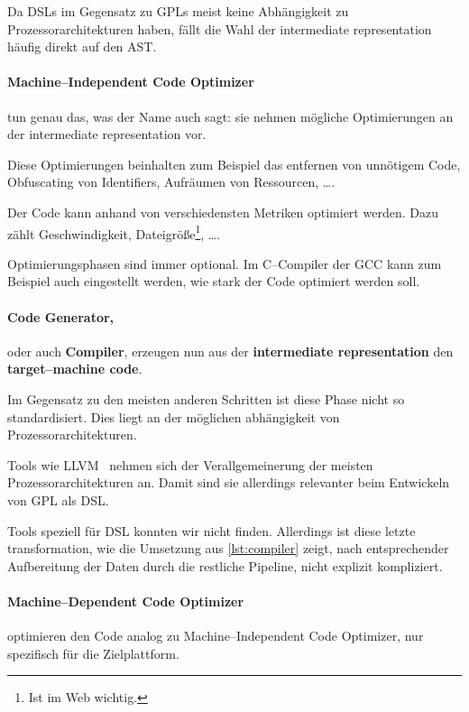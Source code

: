 Da \acp{DSL} im Gegensatz zu \acp{GPL} meist keine Abhängigkeit zu Prozessorarchitekturen haben, fällt die Wahl der intermediate representation häufig direkt auf den \ac{AST}.

\paragraph{Machine--Independent Code Optimizer} tun genau das, was der Name auch sagt: sie nehmen mögliche Optimierungen an der intermediate representation vor.

Diese Optimierungen beinhalten zum Beispiel das entfernen von unnötigem Code, Obfuscating von Identifiers, Aufräumen von Ressourcen, \dots.

Der Code kann anhand von verschiedensten Metriken optimiert werden.
Dazu zählt Geschwindigkeit, Dateigröße\footnote{Ist im Web wichtig.}, \dots.

Optimierungsphasen sind immer optional.
Im C--Compiler der \ac{GCC} kann zum Beispiel auch eingestellt werden, wie stark der Code optimiert werden soll.~\autocite{gnu-project-no-date}

\paragraph{Code Generator,} oder auch \textbf{Compiler}, erzeugen nun aus der \textbf{intermediate representation} den \textbf{target--machine code}.

Im Gegensatz zu den meisten anderen Schritten ist diese Phase nicht so standardisiert.
Dies liegt an der möglichen abhängigkeit von Prozessorarchitekturen.

Tools wie \ac{LLVM}~\autocite{llvm-project-2024} nehmen sich der Verallgemeinerung der meisten Prozessorarchitekturen an.
Damit sind sie allerdings relevanter beim Entwickeln von \ac{GPL} als \ac{DSL}.

Tools speziell für \ac{DSL} konnten wir nicht finden.
Allerdings ist diese letzte transformation, wie die Umsetzung aus \autoref{lst:compiler} zeigt, nach entsprechender Aufbereitung der Daten durch die restliche Pipeline, nicht explizit kompliziert.


\paragraph{Machine--Dependent Code Optimizer} optimieren den Code analog zu Machine--Independent Code Optimizer, nur spezifisch für die Zielplattform.

